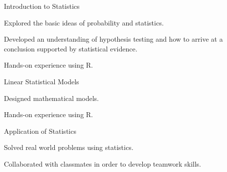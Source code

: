 

\begin{cventries}

  \cventry
    {Introduction to Statistics} %
    {} %
    {} %
    {} %
    {
    \begin{cvitems}
    \item Explored the basic ideas of probability and statistics.
    \item Developed an understanding of hypothesis testing and how to arrive at a conclusion supported by statistical evidence.
    \item Hands-on experience using R.
    \end{cvitems}
    }

  \cventry
    {Linear Statistical Models} %
    {} %
    {} %
    {} %
    {
      \begin{cvitems}
      \item Designed mathematical models.
      \item Hands-on experience using R.
      \end{cvitems}
    }

      \cventry
    {Application of Statistics} %
    {} %
    {} %
    {} %
    {
      \begin{cvitems}
      \item Solved real world problems using statistics.
        \item Collaborated with classmates in order to develop teamwork skills.
      \end{cvitems}
    }
\end{cventries}
